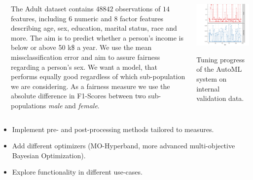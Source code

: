 \documentclass[portrait, 25pt, a0paper, blockverticalspace=0.6cm, innermargin=0.6cm, colspace=0.5cm]{tikzposter}\usepackage[]{graphicx}\usepackage[]{color}
\begin{document}
\begin{columns}
{{  }
  \vspace{-.2cm}
  }
  {
  The Adult dataset contains $48842$ observations of $14$ features, including $6$
  numeric and $8$ factor features describing age, sex, education, marital status, race and more.
  The aim is to predict whether a person's income is below or above 50 k\$ a year.
  We use the mean missclassification error and aim to assure fairness regarding a person's sex.
  We want a model, that performs equally good regardless of which sub-population we are considering.
  As a fairness measure we use the absolute difference in F1-Scores between two sub-populations \textit{male} and \textit{female}.

  \vspace{.4cm}
  \begin{centering}
  \includegraphics[width=0.8\linewidth]{figures/opt_path.png}

  Tuning progress of the AutoML system on internal validation data.
  \end{centering}
  }
\end{columns}
  {
  \begin{minipage}{0.55\textwidth}
  \begin{itemize}
  \item Implement pre- and post-processing methods tailored to measures.
  \item Add different optimizers (MO-Hyperband, more advanced multi-objective Bayesian Optimization).
  \item Explore functionality in different use-cases.
  \end{itemize}
  \end{minipage}
  \begin{minipage}{0.4\textwidth}
    \centering
  \end{minipage}
  }
\end{document}
